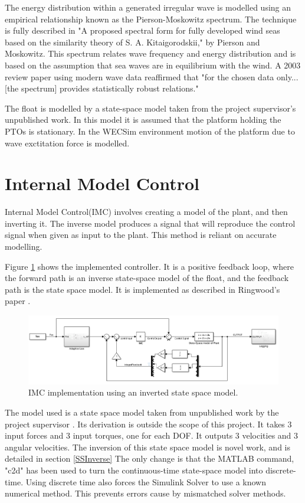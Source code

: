 \documentclass{report}
\begin{document}
The energy distribution within a generated irregular wave is modelled using an empirical relationship known as the Pierson-Moskowitz spectrum. The technique is fully described in "A proposed spectral form for fully developed wind seas based on the similarity theory of S. A. Kitaigorodskii," by Pierson and Moskowitz\cite{OGPM}. This spectrum relates wave frequency and energy distribution and is based on the assumption that sea waves are in equilibrium with the wind. A 2003 review paper using modern wave data reaffirmed that "for the chosen data only... [the spectrum] provides statistically robust relations."\cite{PMReview}

The float is modelled by a state-space model taken from the project supervisor's unpublished work\cite{andyMPC}. In this model it is assumed that the platform holding the PTOs is stationary. In the WECSim environment motion of the platform due to wave exctitation force is modelled.


\section{Internal Model Control}
Internal Model Control(IMC) involves creating a model of the plant, and then inverting it. The inverse model produces a  signal that will reproduce the control signal when given as input to the plant. This method is reliant on accurate modelling.

Figure \ref{fig:IMC} shows the implemented controller. It is a positive feedback loop, where the forward path is an inverse state-space model of the float, and the feedback path is the state space model. It is implemented as described in Ringwood's paper \cite{ringwood}.

\begin{figure}
\centering
\label{fig:IMC}
\includegraphics[scale=0.5]{graphics/fullControlSystem}
\caption{IMC implementation using an inverted state space model.}
\end{figure}

The model used is a state space model taken from unpublished work by the project supervisor \cite{andyMPC}. Its derivation is outside the scope of this project. It takes 3 input forces and 3 input torques, one for each DOF. It outputs 3 velocities and 3 angular velocities. The inversion of this state space model is novel work, and is detailed in section \ref{SSInverse} The only change is that the MATLAB command, "c2d" has been used to turn the continuous-time state-space model into discrete-time. Using discrete time also forces the Simulink Solver to use a known numerical method. This prevents errors cause by mismatched solver methods.
\end{document}
